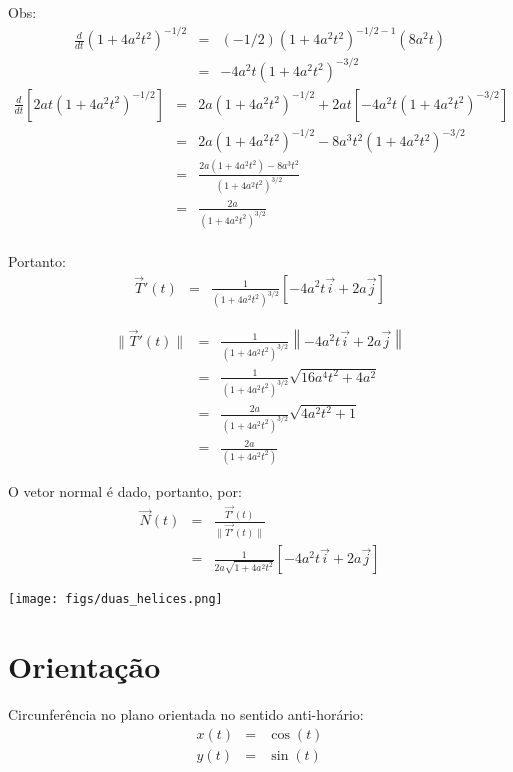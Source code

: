 \documentclass[a4paper,10pt]{book}
\begin{document}
Obs:
\begin{eqnarray*}
\frac{d}{dt}\left(1+4a^2t^2\right)^{-1/2} &=& (-1/2)\left(1+4a^2t^2\right)^{-1/2-1}(8a^2t)\\
 &=&-4a^2t\left(1+4a^2t^2\right)^{-3/2}
\end{eqnarray*}
\begin{eqnarray*}
\frac{d}{dt}\left[2at\left(1+4a^2t^2\right)^{-1/2}\right] &=& 
2a\left(1+4a^2t^2\right)^{-1/2}+2at\left[-4a^2t\left(1+4a^2t^2\right)^{-3/2}\right]\\
&=& 
2a\left(1+4a^2t^2\right)^{-1/2}-8a^3t^2\left(1+4a^2t^2\right)^{-3/2}\\
&=&\frac{2a(1+4a^2t^2)-8a^3t^2}{(1+4a^2t^2)^{3/2}}\\
&=&\frac{2a}{(1+4a^2t^2)^{3/2}}\\
\end{eqnarray*}

Portanto:
\begin{eqnarray*}
\vec{T}'(t)&=&\frac{1}{(1+4a^2t^2)^{3/2}}\left[-4a^2t\vec{i}+2a\vec{j}\right]
\end{eqnarray*}

\begin{eqnarray*}
\|\vec{T}'(t)\|&=&\frac{1}{(1+4a^2t^2)^{3/2}}\left\|-4a^2t\vec{i}+2a\vec{j}\right\|\\
&=&\frac{1}{(1+4a^2t^2)^{3/2}}\sqrt{16a^4t^2+4a^2}\\
&=&\frac{2a}{(1+4a^2t^2)^{3/2}}\sqrt{4a^2t^2+1}\\
&=&\frac{2a}{(1+4a^2t^2)}
\end{eqnarray*}

O vetor normal é dado, portanto, por:
\begin{eqnarray*}
\vec{N}(t)&=&\frac{\vec{T'}(t)}{\|\vec{T'}(t)\|}\\
&=&\frac{1}{2a\sqrt{1+4a^2t^2}}\left[-4a^2t\vec{i}+2a\vec{j}\right]
\end{eqnarray*}


\begin{center}
 \texttt{[image: figs/duas\_helices.png]}
 \end{center}

 \section{Orientação}
 
 Circunferência no plano orientada no sentido anti-horário:
 \begin{eqnarray*}
  x(t) &=& \cos(t)\\
  y(t) &=& \sin(t)\\
 \end{eqnarray*}
 
\end{document}

